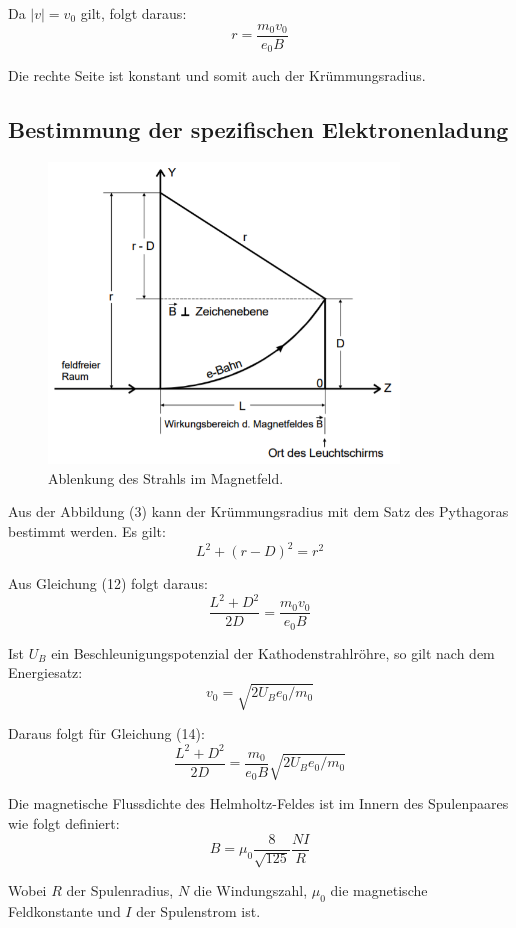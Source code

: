 Da $|v| = v_0$ gilt, folgt daraus:
\begin{equation}
  r = \frac{m_0 v_0}{e_0 B}
\end{equation}

Die rechte Seite ist konstant und somit auch der Krümmungsradius.


\subsection{Bestimmung der spezifischen Elektronenladung}

\begin{figure}[H]
  \centering
  \includegraphics[height=8cm]{ablenkungbfeld.PNG}
  \caption{Ablenkung des Strahls im Magnetfeld. \cite{sample}}
  \label{fig:ablenkungbfeld}
\end{figure}

Aus der Abbildung (3) kann der Krümmungsradius mit dem Satz des Pythagoras bestimmt werden.
Es gilt:
\begin{equation}
  L^2 + (r - D)^2 = r^2
\end{equation}

Aus Gleichung (12) folgt daraus:
\begin{equation}
  \frac{L^2 + D^2}{2D} = \frac{m_0 v_0}{e_0 B}
\end{equation}

Ist $U_B$ ein Beschleunigungspotenzial der Kathodenstrahlröhre, so gilt nach dem Energiesatz:
\begin{equation}
  v_0 = \sqrt{2U_B e_0/m_0}
\end{equation}

Daraus folgt für Gleichung (14):
\begin{equation}
  \frac{L^2 + D^2}{2D} = \frac{m_0}{e_0 B} \sqrt{2U_B e_0/m_0}
\end{equation}

Die magnetische Flussdichte des Helmholtz-Feldes ist im Innern des Spulenpaares wie folgt definiert:
\begin{equation}
  B = \mu_0 \frac{8}{\sqrt{125}} \frac{NI}{R}
\end{equation}

Wobei $R$ der Spulenradius, $N$ die Windungszahl, $\mu_0$ die magnetische Feldkonstante und
$I$ der Spulenstrom ist.
